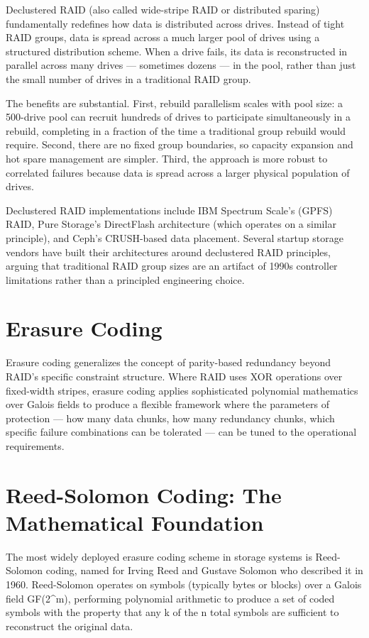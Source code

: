 Declustered RAID (also called wide-stripe RAID or distributed sparing) fundamentally redefines how data is distributed across drives. Instead of tight RAID groups, data is spread across a much larger pool of drives using a structured distribution scheme. When a drive fails, its data is reconstructed in parallel across many drives --- sometimes dozens --- in the pool, rather than just the small number of drives in a traditional RAID group.

The benefits are substantial. First, rebuild parallelism scales with pool size: a 500-drive pool can recruit hundreds of drives to participate simultaneously in a rebuild, completing in a fraction of the time a traditional group rebuild would require. Second, there are no fixed group boundaries, so capacity expansion and hot spare management are simpler. Third, the approach is more robust to correlated failures because data is spread across a larger physical population of drives.

Declustered RAID implementations include IBM Spectrum Scale's (GPFS) RAID, Pure Storage's DirectFlash architecture (which operates on a similar principle), and Ceph's CRUSH-based data placement. Several startup storage vendors have built their architectures around declustered RAID principles, arguing that traditional RAID group sizes are an artifact of 1990s controller limitations rather than a principled engineering choice.

\section{Erasure Coding}
Erasure coding generalizes the concept of parity-based redundancy beyond RAID's specific constraint structure. Where RAID uses XOR operations over fixed-width stripes, erasure coding applies sophisticated polynomial mathematics over Galois fields to produce a flexible framework where the parameters of protection --- how many data chunks, how many redundancy chunks, which specific failure combinations can be tolerated --- can be tuned to the operational requirements.

\section{Reed-Solomon Coding: The Mathematical Foundation}
The most widely deployed erasure coding scheme in storage systems is Reed-Solomon coding, named for Irving Reed and Gustave Solomon who described it in 1960. Reed-Solomon operates on symbols (typically bytes or blocks) over a Galois field GF(2\^{}m), performing polynomial arithmetic to produce a set of coded symbols with the property that any k of the n total symbols are sufficient to reconstruct the original data.

